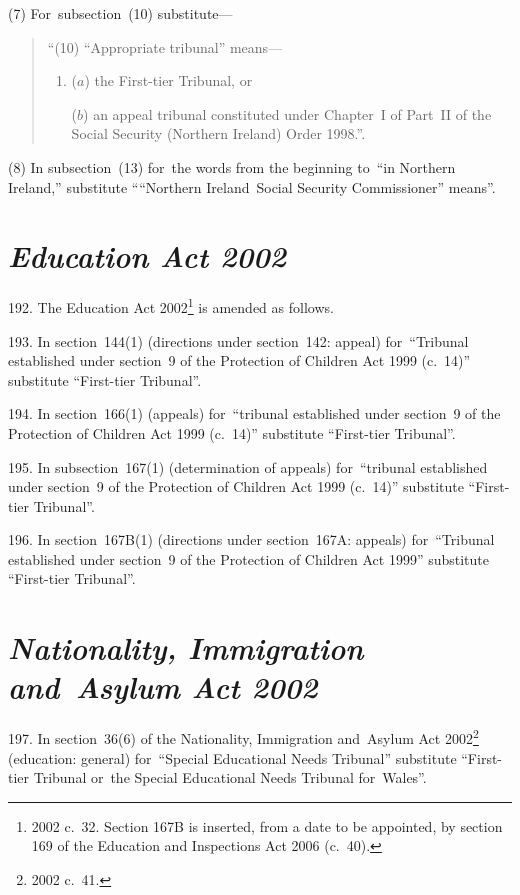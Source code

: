 \documentclass[12pt,a4paper]{article}
\begin{document}
(7) For~subsection~(10) substitute—
\begin{quotation}
“(10) “Appropriate tribunal” means—
\begin{enumerate}\item[]
($a$) the First-tier Tribunal, or

($b$) an appeal tribunal constituted under Chapter~I of Part~II of the Social Security (Northern Ireland) Order 1998.”.
\end{enumerate}
\end{quotation}

(8) In subsection~(13) for~the words from the beginning to~“in Northern Ireland,” substitute ““Northern Ireland~Social Security Commissioner” means”.

\section*{\itshape Education Act 2002}

192.  The Education Act 2002\footnote{2002 c.~32. Section 167B is inserted, from a date to be appointed, by section 169 of the Education and Inspections Act 2006 (c.~40).} is amended as follows.

\medskip

193.  In section~144(1) (directions under section~142: appeal) for~“Tribunal established under section~9 of the Protection of Children Act 1999 (c.~14)” substitute “First-tier Tribunal”.

\medskip

194.  In section~166(1) (appeals) for~“tribunal established under section~9 of the Protection of Children Act 1999 (c.~14)” substitute “First-tier Tribunal”.

\medskip

195.  In subsection~167(1) (determination of appeals) for~“tribunal established under section~9 of the Protection of Children Act 1999 (c.~14)” substitute “First-tier Tribunal”.

\medskip

196.  In section~167B(1) (directions under section~167A: appeals) for~“Tribunal established under section~9 of the Protection of Children Act 1999” substitute “First-tier Tribunal”.

\section*{\itshape\sloppy Nationality, Immigration and~Asylum Act 2002}

197.  In section~36(6) of the Nationality, Immigration and~Asylum Act 2002\footnote{2002 c.~41.} (education: general) for~“Special Educational Needs Tribunal” substitute “First-tier Tribunal or~the Special Educational Needs Tribunal for~Wales”.
\end{document}
